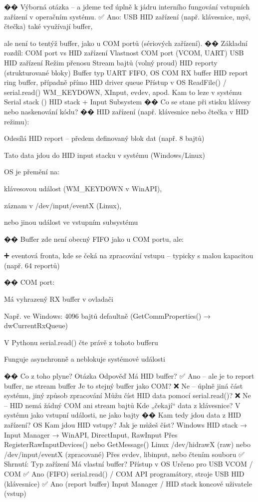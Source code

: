 �� Výborná otázka – a jdeme teď úplně k jádru interního fungování vstupních zařízení v operačním systému.
✅ Ano: USB HID zařízení (např. klávesnice, myš, čtečka) také využívají buffer,

ale není to tentýž buffer, jako u COM portů (sériových zařízení).
�� Základní rozdíl: COM port vs HID zařízení
Vlastnost	COM port (VCOM, UART)	USB HID zařízení
Režim přenosu	Stream bajtů (volný proud)	HID reporty (strukturované bloky)
Buffer typ	UART FIFO, OS COM RX buffer	HID report ring buffer, případně přímo HID driver queue
Přístup v OS	ReadFile() / serial.read()	WM_KEYDOWN, XInput, evdev, apod.
Kam to leze v systému	Serial stack (\Device\Serial)	HID stack + Input Subsystem
�� Co se stane při stisku klávesy nebo naskenování kódu?
�� HID zařízení (např. klávesnice nebo čtečka v HID režimu):

    Odesílá HID report – předem definovaný blok dat (např. 8 bajtů)

    Tato data jdou do HID input stacku v systému (Windows/Linux)

    OS je přemění na:

        klávesovou událost (WM_KEYDOWN v WinAPI),

        záznam v /dev/input/eventX (Linux),

        nebo jinou událost ve vstupním subsystému

�� Buffer zde není obecný FIFO jako u COM portu, ale:

    ➕ eventová fronta, kde se čeká na zpracování vstupu – typicky s malou kapacitou (např. 64 reportů)

�� COM port:

    Má vyhrazený RX buffer v ovladači

    Např. ve Windows: 4096 bajtů defaultně (GetCommProperties() → dwCurrentRxQueue)

    V Pythonu serial.read() čte právě z tohoto bufferu

    Funguje asynchronně a neblokuje systémové události

�� Co z toho plyne?
Otázka	Odpověď
Má HID buffer?	✅ Ano – ale je to report buffer, ne stream buffer
Je to stejný buffer jako COM?	❌ Ne – úplně jiná část systému, jiný způsob zpracování
Můžu číst HID data pomocí serial.read()?	❌ Ne – HID nemá žádný COM ani stream bajtů
Kde „čekají“ data z klávesnice?	V systému jako vstupní události, ne jako bajty
�� Kam tedy jdou data z HID zařízení?
OS	Kam jdou HID vstupy?	Jak je můžeš číst?
Windows	HID stack → Input Manager → WinAPI, DirectInput, RawInput	Přes RegisterRawInputDevices() nebo GetMessage()
Linux	/dev/hidrawX (raw) nebo /dev/input/eventX (zpracované)	Přes evdev, libinput, nebo čtením souboru
✅ Shrnutí:
Typ zařízení	Má vlastní buffer?	Přístup v OS	Určeno pro
USB VCOM / COM	✅ Ano (FIFO)	serial.read() / COM API	programátory, stroje
USB HID (klávesnice)	✅ Ano (report buffer)	Input Manager / HID stack	koncové uživatele (vstup)

